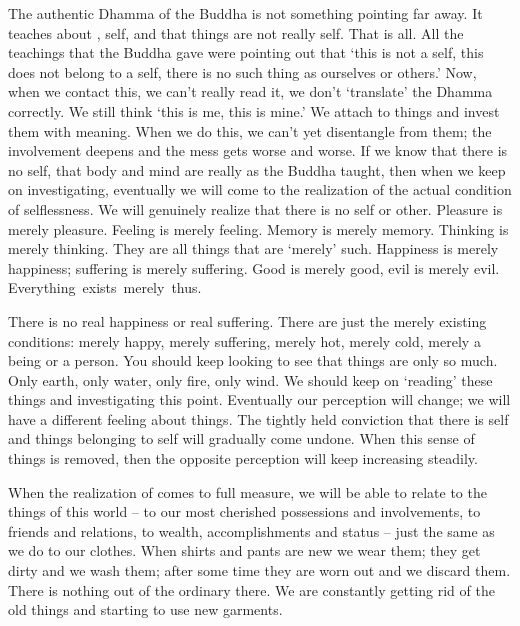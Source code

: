 The authentic Dhamma of the Buddha is not something pointing far away. It teaches about , self, and that things are not really self. That is all. All the teachings that the Buddha gave were pointing out that `this is not a self, this does not belong to a self, there is no such thing as ourselves or others.' Now, when we contact this, we can't really read it, we don't `translate' the Dhamma correctly. We still think `this is me, this is mine.' We attach to things and invest them with meaning. When we do this, we can't yet disentangle from them; the involvement deepens and the mess gets worse and worse. If we know that there is no self, that body and mind are really  as the Buddha taught, then when we keep on investigating, eventually we will come to the realization of the actual condition of selflessness. We will genuinely realize that there is no self or other. Pleasure is merely pleasure. Feeling is merely feeling. Memory is merely memory. Thinking is merely thinking. They are all things that are `merely' such. Happiness is merely happiness; suffering is merely suffering. Good is merely good, evil is merely evil. \mbox{Everything exists merely thus.}

There is no real happiness or real suffering. There are just the merely existing conditions: merely happy, merely suffering, merely hot, merely cold, merely a being or a person. You should keep looking to see that things are only so much. Only earth, only water, only fire, only wind. We should keep on `reading' these things and investigating this point. Eventually our perception will change; we will have a different feeling about things. The tightly held conviction that there is self and things belonging to self will gradually come undone. When this sense of things is removed, then the opposite perception will keep increasing steadily.

When the realization of  comes to full measure, we will be able to relate to the things of this world -- to our most cherished possessions and involvements, to friends and relations, to wealth, accomplishments and status -- just the same as we do to our clothes. When shirts and pants are new we wear them; they get dirty and we wash them; after some time they are worn out and we discard them. There is nothing out of the ordinary there. We are constantly getting rid of the old things and starting to use new garments.

